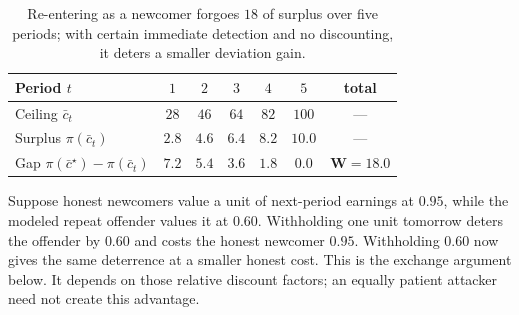 \documentclass[11pt,a4paper]{article}
\theoremstyle{definition}
\begin{document}
\begin{table}[H]
\centering\small\renewcommand{\arraystretch}{1.25}
\begin{tabular}{@{}l c c c c c c@{}}
\toprule
Period $t$ & $1$ & $2$ & $3$ & $4$ & $5$ & \textbf{total} \\
\midrule
Ceiling $\bar{c}_t$ & $28$ & $46$ & $64$ & $82$ & $100$ & --- \\
Surplus $\pi(\bar{c}_t)$ & $2.8$ & $4.6$ & $6.4$ & $8.2$ & $10.0$ & --- \\
Gap $\pi(\bar{c}^\star)-\pi(\bar{c}_t)$ & $7.2$ & $5.4$ & $3.6$ & $1.8$ & $0.0$ & $\mathbf{W=18.0}$ \\
\bottomrule
\end{tabular}
\caption{Re-entering as a newcomer forgoes $18$ of surplus over five periods;
with certain immediate detection and no discounting, it deters a smaller deviation gain.}
\label{tab:whitewash-numbers}
\end{table}


%
Suppose honest newcomers value a unit of next-period earnings at $0.95$, while the modeled repeat offender values it at $0.60$. Withholding one unit tomorrow deters the offender by $0.60$ and costs the honest newcomer $0.95$. Withholding $0.60$ now gives the same deterrence at a smaller honest cost. This is the exchange argument below. It depends on those relative discount factors; an equally patient attacker need not create this advantage.
\end{document}
